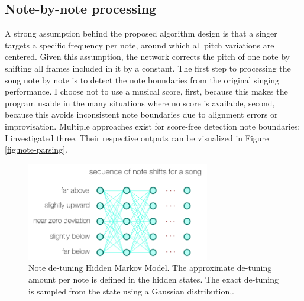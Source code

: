 \subsection{Note-by-note processing}
\label{sec:notes}
A strong assumption behind the proposed algorithm design is that a singer targets a specific frequency per note, around which all pitch variations are centered. Given this assumption, the network corrects the pitch of one note by shifting all frames included in it by a constant. The first step to processing the song note by note is to detect the note boundaries from the original singing performance. I choose not to use a musical score, first, because this makes the program usable in the many situations where no score is available, second, because this avoids inconsistent note boundaries due to alignment errors or improvisation. Multiple approaches exist for score-free detection note boundaries: I investigated three. Their respective outputs can be visualized in Figure \ref{fig:note-parsing}.
\begin{figure}[t!]
    \centering
    \includegraphics[width=8cm]{images/note_detuning_hmm.png}
    \caption{Note de-tuning Hidden Markov Model. The approximate de-tuning amount per note is defined in the hidden states. The exact de-tuning is sampled from the state using a Gaussian distribution,.}
    \label{fig:detuning_hmm}
\end{figure}

